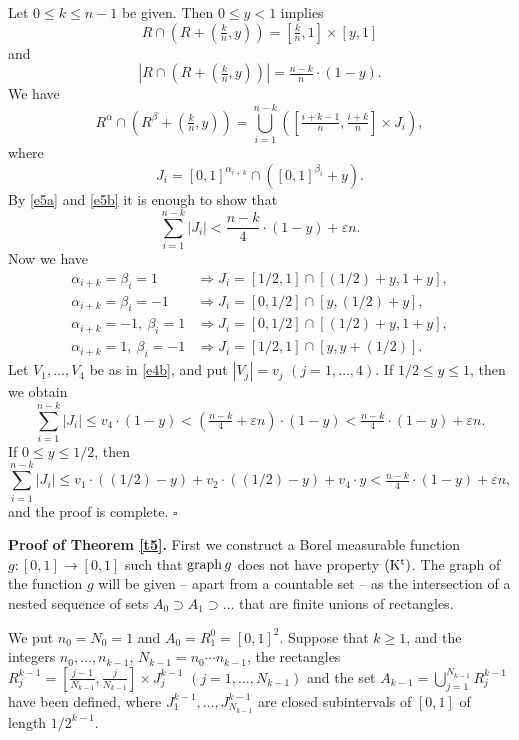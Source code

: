 \documentclass[12pt]{article}
\def\sp{\supset}
\def\al{\alpha}
\def\be{\beta}
\def\ep{\varepsilon}
\def\cd{\cdot}
\def\stb{,\ldots ,}
\def\nl{[0,1]}
\def\graph{{\rm graph}\, }
\def\akkor{\Longrightarrow}
\begin{document}
Let $0\le k\le n-1$ be given. Then $0\le y <1$ implies
$$R\cap \left( R + \left( \tfrac{k}{n},y \right) \right) = \left[
  \tfrac{k}{n},1  \right] \times [y,1]$$
and
\begin{equation}\label{e5a}
\left| R\cap \left( R + \left( \tfrac{k}{n},y \right) \right) \right|
=\tfrac{n-k}{n} \cd (1-y).
\end{equation}
We have
\begin{equation}\label{e5b}
R^\al \cap \left( R^\be + \left( \tfrac{k}{n},y \right) \right) =
\bigcup_{i=1}^{n-k} \left( \left[ \tfrac{i+k-1}{n},\tfrac{i+k}{n}\right] 
\times J_i \right) ,
\end{equation}
where
\begin{equation*}
J_i = \nl ^{\al _{i+k}} \cap \left( \nl ^{\be _{i}} +y\right) .
\end{equation*}
By \eqref{e5a} and \eqref{e5b} it is enough to show that
\begin{equation*} 
\sum_{i=1}^{n-k} |J_i |< \frac{n-k}{4} \cd (1-y) + \ep n. 
\end{equation*}   
Now we have
\begin{align*}
  \al _{i+k} =\be _i =1 &\akkor J_i =[1/2,1] \cap [(1/2)+y,1+y] ,\\
  \al _{i+k} =\be _i =-1 &\akkor J_i =[0,1/2] \cap [y,(1/2)+y]  ,\\
  \al _{i+k} =-1, \ \be _i =1 &\akkor J_i =[0,1/2] \cap [(1/2)+y,1+y] ,\\
  \al _{i+k} =1, \ \be _i =-1 &\akkor J_i =[1/2,1] \cap [y,y+(1/2)] .
\end{align*}
Let $V_1 \stb V_4$ be as in \eqref{e4b}, and put $|V_j |=v_j$ $(j=1\stb 4)$.
If $1/2\le y\le 1$, then we obtain
$$  \sum_{i=1}^{n-k} |J_i | \le  v_4 \cd (1-y) < \left( \tfrac{n-k}{4} +\ep n
\right) \cd (1-y)< \tfrac{n-k}{4} \cd (1-y) + \ep  n.$$
If $0\le y\le 1/2$, then
$$\sum_{i=1}^{n-k} |J_i | \le  v_1 \cd ((1/2)-y)+ v_2 \cd ((1/2)-y)+
v_4 \cd y < \tfrac{n-k}{4} \cd (1-y) + \ep n,$$
and the proof is complete. \hfill $\square$

{\bf Proof of Theorem \ref{t5}.} First we construct a Borel measurable
function $g\colon \nl \to \nl$ such that $\graph g$  does not have
property ${\rm (K^t)}$. The graph of the function $g$ will be given -- apart
from a countable set -- as the intersection of a nested sequence of sets
$A_0 \sp A_1 \sp \ldots$ that are finite unions of rectangles. 

We put $n_0 =N_0 =1$ and $A_0 =R^0_1 =\nl ^2$. Suppose that $k\ge 1$, and
the integers $n_0 \stb n_{k-1}$, $N_{k-1} =n_0 \cdots n_{k-1}$, the rectangles
$R^{k-1}_j =\left[ \tfrac{j-1}{N_{k-1}},\tfrac{j}{N_{k-1}} \right] \times J^{k-1}_j$
$(j=1\stb N_{k-1})$ and the set $A_{k-1}= \bigcup_{j=1}^{N_{k-1}} R^{k-1}_j$ have been
defined, where $J^{k-1}_1 \stb J^{k-1}_{N_{k-1}}$ are closed subintervals of $\nl$
of length $1/2^{k-1}$.
\end{document}
